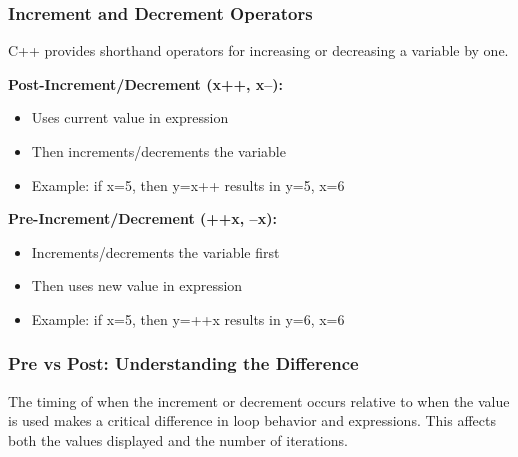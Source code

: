\documentclass{beamer}
\begin{document}
\begin{frame}
\frametitle{Increment and Decrement Operators}
C++ provides shorthand operators for increasing or decreasing a variable by one.

\textbf{Post-Increment/Decrement (x++, x--):}
\begin{itemize}
\item Uses current value in expression
\pause
\item Then increments/decrements the variable
\pause
\item Example: if x=5, then y=x++ results in y=5, x=6
\end{itemize}

\textbf{Pre-Increment/Decrement (++x, --x):}
\begin{itemize}
\item Increments/decrements the variable first
\pause
\item Then uses new value in expression
\pause
\item Example: if x=5, then y=++x results in y=6, x=6
\end{itemize}
\end{frame}




\begin{frame}
\frametitle{Pre vs Post: Understanding the Difference}
The timing of when the increment or decrement occurs relative to when the value is used makes a critical difference in loop behavior and expressions. This affects both the values displayed and the number of iterations.
\end{frame}
\end{document}
